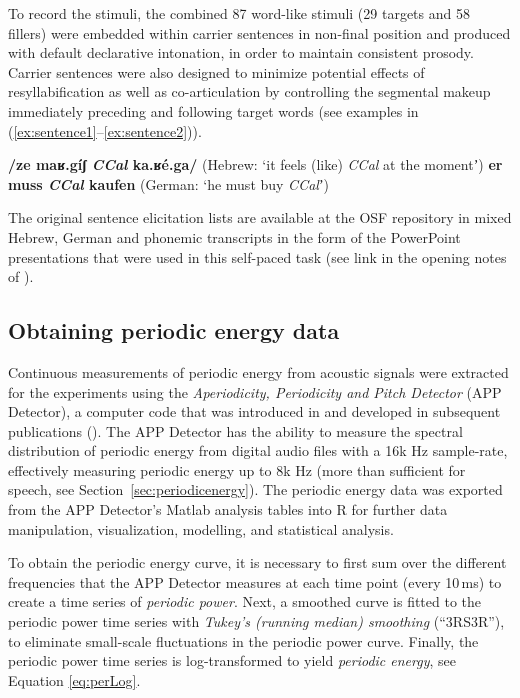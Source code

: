 To record the stimuli, the combined 87 word-like stimuli (29 targets and 58 fillers) were embedded within carrier sentences in non-final position and produced with default declarative intonation, in order to maintain consistent prosody. Carrier sentences were also designed to minimize potential effects of resyllabification as well as co-articulation by controlling the segmental makeup immediately preceding and following target words (see examples in (\ref{ex:sentence1}--\ref{ex:sentence2})).

\begin{exe}
\ex \textbf{/ze maʁ.gíʃ \emph{CCal} ka.ʁé.ga/} (Hebrew: `it feels (like) \emph{CCal} at the momentʼ) \label{ex:sentence1}
\ex \textbf{er muss \emph{CCal} kaufen} (German: `he must buy \emph{CCal}ʼ) \label{ex:sentence2}
\end{exe}

The original sentence elicitation lists are available at the OSF repository in mixed Hebrew, German and phonemic transcripts in the form of the PowerPoint presentations that were used in this self-paced task (see link in the opening notes of ).

\subsection{Obtaining periodic energy data}\label{sec:obtaining}\largerpage

Continuous measurements of periodic energy from acoustic signals were extracted for the experiments using the \emph{Aperiodicity, Periodicity and Pitch Detector} (APP Detector), a computer code that was introduced in \citet{deshmukh2003detectionsk} and developed in subsequent publications (\citealt{deshmukh2005use, vishnubhotla2007detection}).
The APP Detector has the ability to measure the spectral distribution of periodic energy from digital audio files with a 16k Hz sample-rate, effectively measuring periodic energy up to 8k Hz (more than sufficient for speech, see Section~\ref{sec:periodicenergy}).
The periodic energy data was exported from the APP Detector's Matlab analysis tables into R \citep{R-base} for further data manipulation, visualization, modelling, and statistical analysis.

To obtain the periodic energy curve, it is necessary to first sum over the different frequencies that the APP Detector measures at each time point (every 10\,ms) to create a time series of \emph{periodic power}.
Next, a smoothed curve is fitted to the periodic power time series with \emph{Tukey's (running median) smoothing} (\enquote{3RS3R}), to eliminate small-scale fluctuations in the periodic power curve.
Finally, the periodic power time series is log-transformed to yield \emph{periodic energy}, see Equation \eqref{eq:perLog}.

